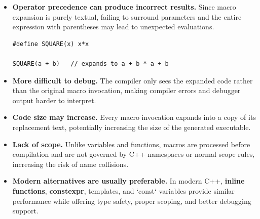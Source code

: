 \documentclass[10pt]{article}
\begin{document}
\begin{itemize}
\begin{itemize}
\begin{verbatim}
SQUARE(i++)   // expands to ((i++) * (i++))
        \end{verbatim}

        \item \textbf{Operator precedence can produce incorrect results.} Since macro expansion is purely textual, failing to surround parameters and the entire expression with parentheses may lead to unexpected evaluations.
        \begin{verbatim}
#define SQUARE(x) x*x

SQUARE(a + b)   // expands to a + b * a + b
        \end{verbatim}

        \item \textbf{More difficult to debug.} The compiler only sees the expanded code rather than the original macro invocation, making compiler errors and debugger output harder to interpret.

        \item \textbf{Code size may increase.} Every macro invocation expands into a copy of its replacement text, potentially increasing the size of the generated executable.

        \item \textbf{Lack of scope.} Unlike variables and functions, macros are processed before compilation and are not governed by C++ namespaces or normal scope rules, increasing the risk of name collisions.

        \item \textbf{Modern alternatives are usually preferable.} In modern C++, \textbf{inline functions}, \textbf{constexpr}, templates, and `const` variables provide similar performance while offering type safety, proper scoping, and better debugging support.
    \end{itemize}
\end{itemize}

\newpage
\end{document}
